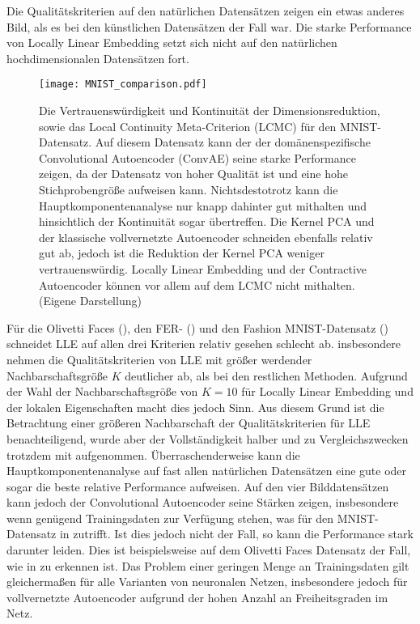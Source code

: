 Die Qualitätskriterien auf den natürlichen Datensätzen zeigen ein etwas anderes Bild, als es bei
den künstlichen Datensätzen der Fall war. Die starke Performance von Locally Linear Embedding setzt
sich nicht auf den natürlichen hochdimensionalen Datensätzen fort.
\begin{figure}[ht]
	\begin{center}
		\texttt{[image: MNIST\_comparison.pdf]}
	\end{center}
	\caption[Qualitätskriterien für MNIST]{Die Vertrauenswürdigkeit und Kontinuität der Dimensionsreduktion, sowie das Local Continuity Meta-Criterion (LCMC) für den MNIST-Datensatz. Auf diesem Datensatz kann der der domänenspezifische Convolutional Autoencoder (ConvAE) seine starke Performance zeigen, da der Datensatz von hoher Qualität ist und eine hohe Stichprobengröße aufweisen kann. Nichtsdestotrotz kann die Hauptkomponentenanalyse nur knapp dahinter gut mithalten und hinsichtlich der Kontinuität sogar übertreffen. Die Kernel PCA und der klassische vollvernetzte Autoencoder schneiden ebenfalls relativ gut ab, jedoch ist die Reduktion der Kernel PCA weniger vertrauenswürdig. Locally Linear Embedding und der Contractive Autoencoder können vor allem auf dem LCMC nicht mithalten. (Eigene Darstellung)}
	\label{fig:MNISTMetrics}
\end{figure}
Für die Olivetti Faces (), den FER- () und den Fashion MNIST-Datensatz ()
schneidet LLE auf allen drei Kriterien relativ gesehen schlecht ab. insbesondere nehmen die
Qualitätskriterien von LLE mit größer werdender Nachbarschaftsgröße $K$ deutlicher ab, als bei den
restlichen Methoden. Aufgrund der Wahl der Nachbarschaftsgröße von $K=10$ für Locally Linear
Embedding und der lokalen Eigenschaften macht dies jedoch Sinn. Aus diesem Grund ist die
Betrachtung einer größeren Nachbarschaft der Qualitätskriterien für LLE benachteiligend, wurde aber
der Vollständigkeit halber und zu Vergleichszwecken trotzdem mit aufgenommen. Überraschenderweise
kann die Hauptkomponentenanalyse auf fast allen natürlichen Datensätzen eine gute oder sogar die
beste relative Performance aufweisen. Auf den vier Bilddatensätzen kann jedoch der Convolutional
Autoencoder seine Stärken zeigen, insbesondere wenn genügend Trainingsdaten zur Verfügung stehen, was für den MNIST-Datensatz in  zutrifft.
Ist dies jedoch nicht der Fall, so kann die Performance stark darunter leiden. Dies ist
beispielsweise auf dem Olivetti Faces Datensatz der Fall, wie in 
zu erkennen ist. Das Problem einer geringen Menge an Trainingsdaten gilt gleichermaßen für alle
Varianten von neuronalen Netzen, insbesondere jedoch für vollvernetzte Autoencoder aufgrund der
hohen Anzahl an Freiheitsgraden im Netz.

